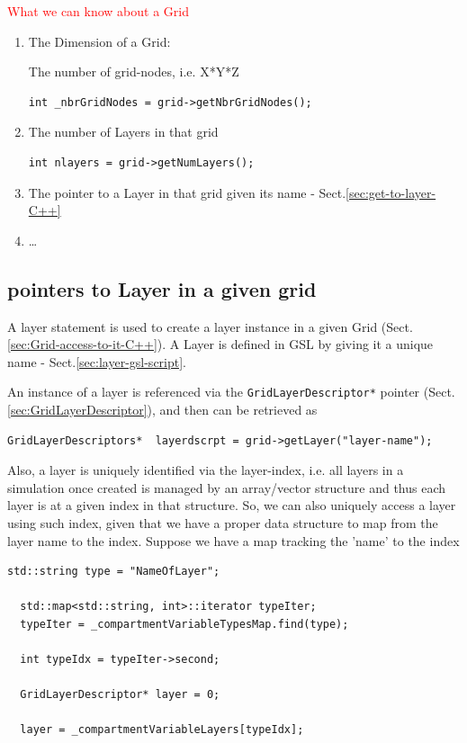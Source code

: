\textcolor{red}{What we can know about a Grid}
\begin{enumerate}
  \item The Dimension of a Grid:
  
The number of grid-nodes, i.e. X*Y*Z
\begin{lstlisting}
int _nbrGridNodes = grid->getNbrGridNodes();
\end{lstlisting}  
  
  \item The number of Layers in that grid
  
\begin{lstlisting}
int nlayers = grid->getNumLayers();
\end{lstlisting}

  \item The pointer to a Layer  in that grid given its name
- Sect.\ref{sec:get-to-layer-C++}  

  \item \ldots
\end{enumerate}

\subsection{pointers to Layer in a given grid}
\label{sec:layer-access-to-it-C++}
\label{sec:get-to-layer-C++}

A layer statement is used to create a layer instance in a given Grid
(Sect.\ref{sec:Grid-access-to-it-C++}). A Layer is defined in GSL by giving
it a unique name - Sect.\ref{sec:layer-gsl-script}. 

An instance of a layer is referenced via
the \verb!GridLayerDescriptor*! pointer (Sect.\ref{sec:GridLayerDescriptor}),
and then can be retrieved as

\begin{lstlisting}
GridLayerDescriptors*  layerdscrpt = grid->getLayer("layer-name");
\end{lstlisting}

Also, a layer is uniquely identified via the layer-index, i.e. all layers in a
simulation once created is managed by an array/vector structure and thus each
layer is at a given index in that structure. So, we can also uniquely access a
layer using such index, given that we have a proper data structure to map from
the layer name to the index. Suppose we have a map tracking the 'name' to the
index
\begin{verbatim}
std::string type = "NameOfLayer";

  std::map<std::string, int>::iterator typeIter;
  typeIter = _compartmentVariableTypesMap.find(type);
  
  int typeIdx = typeIter->second;

  GridLayerDescriptor* layer = 0;

  layer = _compartmentVariableLayers[typeIdx];
\end{verbatim}






